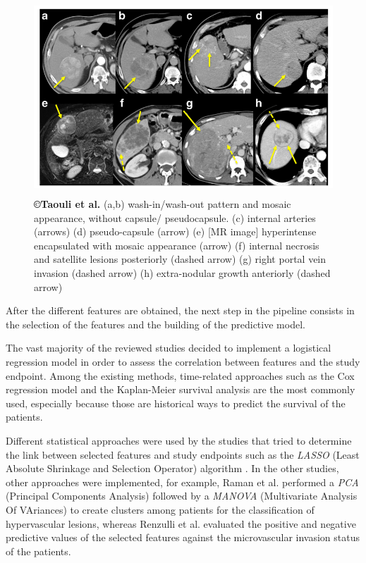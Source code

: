 \documentclass[]{article}
\begin{document}
\begin{figure}[ht!]
\centering
\includegraphics[width=4.67498in,height=2.86979in]{./images/image8.png}
\caption{\textbf{©Taouli et al.} \cite{Taouli2017}
(a,b) wash-in/wash-out pattern and mosaic appearance, without capsule/
pseudocapsule.
(c) internal arteries (arrows)
(d) pseudo-capsule (arrow)
(e) {[}MR image{]} hyperintense encapsulated with mosaic appearance
(arrow)
(f) internal necrosis and satellite lesions posteriorly (dashed arrow)
(g) right portal vein invasion (dashed arrow)
(h) extra-nodular growth anteriorly (dashed arrow)
}
\label{Taouli_imagingTraits}
\end{figure}


After the different features are obtained, the next step in the pipeline
consists in the selection of the features and the building of the
predictive model.

The vast majority of the reviewed studies decided to implement a
logistical regression model in order to assess the correlation between
features and the study endpoint. Among the existing methods,
time-related approaches such as the Cox regression model \cite{Li2016,Banerjee2015,Zheng2018,Cozzi2017,Xia2018} and the Kaplan-Meier survival analysis
\cite{Segal2007,Chen2017,Akai2018,Xia2018} are the most commonly used,
especially because those are historical ways to predict the survival of
the patients.

Different statistical approaches were used by the studies that tried to
determine the link between selected features and study endpoints such as
the \emph{LASSO} (Least Absolute Shrinkage and Selection Operator)
algorithm \cite{Zhou2017a,Peng2018,Bakr2017}. In the other studies, other
approaches were implemented, for example, Raman et al.
performed a \emph{PCA} (Principal Components Analysis) followed by a
\emph{MANOVA} (Multivariate Analysis Of VAriances) to create clusters
among patients for the classification of hypervascular lesions, whereas
Renzulli et al. evaluated the positive and negative predictive
values of the selected features against the microvascular invasion
status of the patients.
\end{document}
